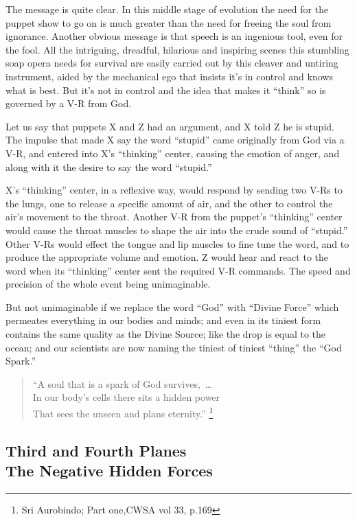 \documentclass[12pt,a4paper]{book}
\begin{document}
The message is quite clear. In this middle stage of evolution the need
for the puppet show to go on is much greater than the need for freeing
the soul from ignorance. Another obvious message is that speech is an
ingenious tool, even for the fool. All the intriguing, dreadful,
hilarious and inspiring scenes this stumbling soap opera needs for
survival are easily carried out by this cleaver and untiring
instrument, aided by the mechanical ego that insists it's in control
and knows what is best. But it's not in control and the idea that
makes it ``think'' so is governed by a V-R from God.

Let us say that puppets X and Z had an argument, and X told Z he is
stupid. The impulse that made X say the word ``stupid'' came
originally from God via a V-R, and entered into X's ``thinking''
center, causing the emotion of anger, and along with it the desire to
say the word ``stupid.''

X's ``thinking'' center, in a reflexive way, would respond by sending
two V-Rs to the lungs, one to release a specific amount of air, and
the other to control the air's movement to the throat. Another V-R
from the puppet's ``thinking'' center would cause the throat muscles
to shape the air into the crude sound of ``stupid.''  Other V-Rs would
effect the tongue and lip muscles to fine tune the word, and to
produce the appropriate volume and emotion. Z would hear and react to
the word when its ``thinking'' center sent the required V-R
commands. The speed and precision of the whole event being
unimaginable.

But not unimaginable if we replace the word ``God'' with ``Divine
Force'' which permeates everything in our bodies and minds; and even
in its tiniest form contains the same quality as the Divine Source;
like the drop is equal to the ocean; and our scientists are now naming
the tiniest of tiniest ``thing'' the ``God Spark.''

\begin{verse}
``A soul that is a spark of God survives,\ \ldots\\
In our body's cells there sits a hidden power\\
That sees the unseen and plans eternity.'' \footnote {Sri Aurobindo; Part one,CWSA vol 33, p.169}
\end{verse}

\newpage
\begin{center}\section*{Third and Fourth Planes\\The Negative Hidden Forces}\end{center}
\end{document}
